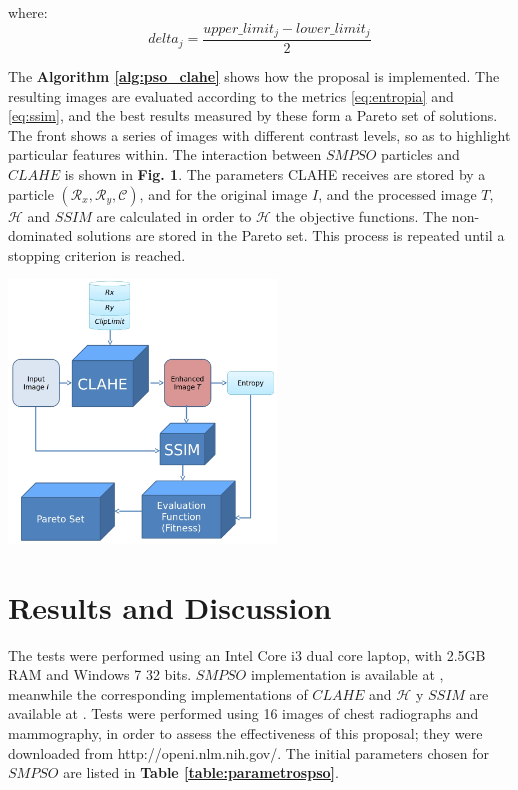 \documentclass[spanish,twocolumn]{article}
\begin{document}
{where: 
\begin{equation} \label{eq:restricciondelta2}
delta_j= \frac{upper\_limit_j - lower\_limit_j}{2}
\end{equation}

The \textbf{Algorithm \ref{alg:pso_clahe}} shows how the proposal is implemented. The resulting images are evaluated according to the metrics \eqref{eq:entropia} and \eqref{eq:ssim}, and the best results measured by these form a Pareto set of solutions. The front shows a series of images with different contrast levels, so as to highlight particular features within. The interaction between $SMPSO$ particles and $CLAHE$ is  shown in \textbf {Fig. 1}. The parameters CLAHE receives are stored by a particle $(\mathcal{R}_x,\mathcal{R}_y, \mathscr{C})$, and for the original image $I$, and the processed image $T$, $\mathscr{H}$ and $SSIM$ are calculated in order to $\mathscr{H}$ the objective functions. The non-dominated solutions are stored in the Pareto set. This process is repeated until a stopping criterion is reached.

\begin{minipage}[b]{1.0\linewidth}
  \vspace{0.5cm}
  \centering
  \centerline{\includegraphics[height=7cm]{Figures/particula_clahe2}}
  \vspace{0.5cm}
  \label{fig:particula_clahe}
\end{minipage}

\section{Results and Discussion}
\label{sec:resultadosdiscusion}

The tests were performed using an Intel Core i3 dual core laptop, with 2.5GB RAM and Windows 7 32 bits. $SMPSO$ implementation is available at \cite{5586354}, meanwhile the corresponding implementations of $CLAHE$ and $\mathscr{H}$ y $SSIM$ are available at \cite{opencv_library}. Tests were performed using 16 images of chest radiographs and mammography, in order to assess the effectiveness of this proposal; they were downloaded from http://openi.nlm.nih.gov/. The initial parameters chosen for $SMPSO$ are listed in \textbf{Table \ref{table:parametrospso}}.



}
\end{document}
